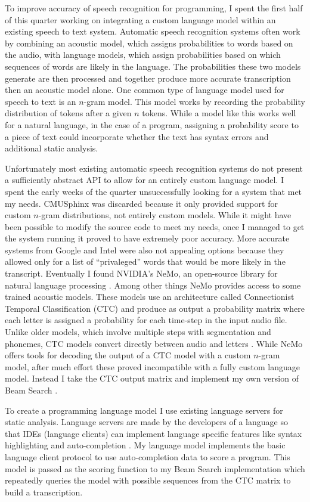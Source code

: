 \documentclass{article}
\begin{document}
To improve accuracy of speech recognition for programming, I spent the first half of this quarter working on integrating a custom language model within an existing speech to text system. Automatic speech recognition systems often work by combining an acoustic model, which assigns probabilities to words based on the audio, with language models, which assign probabilities based on which sequences of words are likely in the language. The probabilities these two models generate are then processed and together produce more accurate transcription then an acoustic model alone. One common type of language model used for speech to text is an $n$-gram model. This model works by recording the probability distribution of tokens after a given $n$ tokens. While a model like this works well for a natural language, in the case of a program, assigning a probability score to a piece of text could incorporate whether the text has syntax errors and additional static analysis.

Unfortunately most existing automatic speech recognition systems do not present a sufficiently abstract API to allow for an entirely custom language model. I spent the early weeks of the quarter unsuccessfully looking for a system that met my needs. CMUSphinx was discarded because it only provided support for custom $n$-gram distributions, not entirely custom models. While it might have been possible to modify the source code to meet my needs, once I managed to get the system running it proved to have extremely poor accuracy. More accurate systems from Google and Intel were also not appealing options because they allowed only for a list of ``privaleged'' words that would be more likely in the transcript. Eventually I found NVIDIA's NeMo, an open-source library for natural language processing \cite{nemo}. Among other things NeMo provides access to some trained acoustic models. These models use an architecture called Connectionist Temporal Classification (CTC) and produce as output a probability matrix where each letter is assigned a probability for each time-step in the input audio file. Unlike older models, which involve multiple steps with segmentation and phonemes, CTC models convert directly between audio and letters \cite{ctc}. While NeMo offers tools for decoding the output of a CTC model with a custom $n$-gram model, after much effort these proved incompatible with a fully custom language model. Instead I take the CTC output matrix and implement my own version of Beam Search \cite{beam}.

To create a programming language model I use existing language servers for static analysis. Language servers are made by the developers of a language so that IDEs (language clients) can implement language specific features like syntax highlighting and auto-completion \cite{lsp}. My language model implements the basic language client protocol to use auto-completion data to score a program. This model is passed as the scoring function to my Beam Search implementation which repeatedly queries the model with possible sequences from the CTC matrix to build a transcription.
\end{document}
